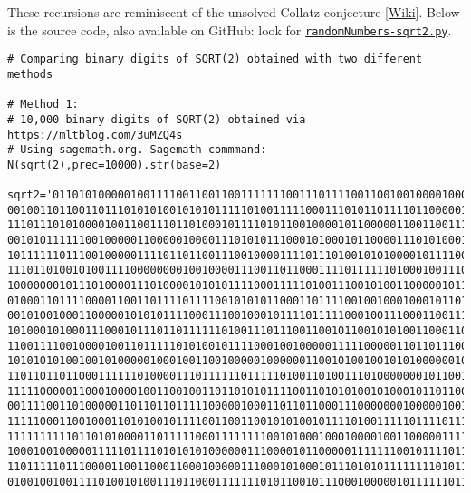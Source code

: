 \documentclass[oneside,10pt]{book}
\begin{document}
\noindent These recursions are reminiscent of the unsolved \textcolor{index}{Collatz conjecture} [\href{https://en.wikipedia.org/wiki/Collatz_conjecture}{Wiki}]. Below is the source code, also available on GitHub: look for \href{https://github.com/VincentGranville/Experimental-Math-Number-Theory/blob/main/Source-Code/randomNumbers-sqrt2.py}{\texttt{randomNumbers-sqrt2.py}}.  \\


\begin{lstlisting}
# Comparing binary digits of SQRT(2) obtained with two different methods

# Method 1:
# 10,000 binary digits of SQRT(2) obtained via https://mltblog.com/3uMZQ4s
# Using sagemath.org. Sagemath commmand: N(sqrt(2),prec=10000).str(base=2)

sqrt2='011010100000100111100110011001111111001110111100110010010000100010110010111110110\
0010011011001101110101010010101011111010011111000111010110111101100000101110101000100100\
1110111010100001001100111011010001011110101100100001011000001100110011100110010001010101\
0010101111110010000011000001000011101010111000101000101100001110101000101100011111111001\
1011111101110010000011110110110011100100001111011101001010100001011110010000111001110001\
1110110100101001111000000001001000011100110110001111011111101000100111011010001101001000\
1000000010111010000111010000101010111100011111010011100101001100000101100111000110000000\
0100011011110000110011011110111100101010110001101111001001000100010110100010000100010110\
0010100100011000001010101111000111001000101111011111000100111000110011110001101101010110\
1010001010001110001011101101111110100111011100110010110010101001100011010000110011000111\
1100111100100001001101111101010010111100010010000011111000001101101110010110000010111011\
1010101010010010100000100010011001000001000000110010100100101010000001001110010100101010\
1101101101100011111101000011101111110111110100110100111010000000101100111010111100100100\
1111100000110001000010011001001101101010111100110101010010100010110110010100011011100011\
0011110011010000011011011011111000001000110110110001110000000100000100110111000000000111\
1111100011001000110101001011110011001100101010010111101001111101111011110110100001111010\
1111111111011010100001101111100011111111001010001000100001001100000111110111101010000001\
1000100100000111110111101010101000000111000010110000011111110010111101110111101010001011\
1101111101110000110011000110001000001110001010001011101010111111110101111100111011001011\
0100100100111101001010011101100011111110101100101110001000001011111101111111100001011100\

\end{lstlisting}
\end{document}

